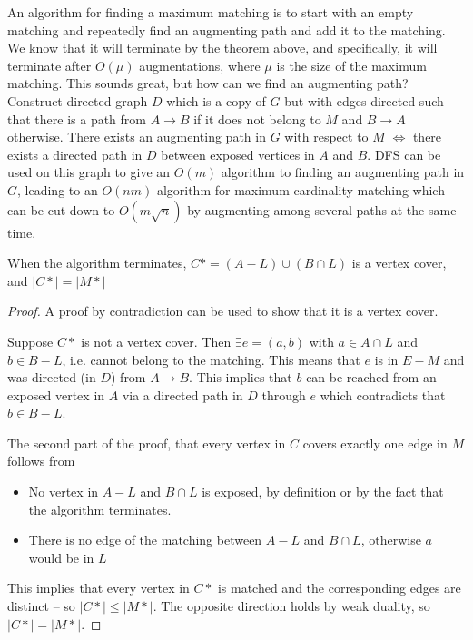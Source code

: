 \documentclass[../notes.tex]{subfiles}
\begin{document}
An algorithm for finding a maximum matching is to start with an empty matching and repeatedly find an augmenting path and add it to the matching. 
We know that it will terminate by the theorem above, and specifically, it will terminate after $ O(\mu) $ augmentations, where $ \mu $ is the size of the maximum matching. 
This sounds great, but how can we find an augmenting path? Construct directed graph $ D $ which is a copy of $ G $ but with edges directed such that there is a path from $ A \to B $ if it does not belong to $ M $ and $ B \to A $ otherwise.
There exists an augmenting path in $ G $ with respect to $ M $ $ \iff $ there exists a directed path in $ D $ between exposed vertices in $ A $ and $ B $. DFS can be used on this graph to give an $ O(m) $ algorithm to finding an augmenting path in $ G $, leading to an $ O(nm) $ algorithm for maximum cardinality matching which can be cut down to $ O(m \sqrt{n})$ by augmenting among several paths at the same time.

When the algorithm terminates, $ C* = (A-L) \cup (B \cap L) $ is a vertex cover, and $ |C*| = |M*|$

\begin{proof}
    A proof by contradiction can be used to show that it is a vertex cover.

    Suppose $ C* $ is not a vertex cover. Then $ \exists e = (a,b)  $ with $ a \in A\cap L $ and $ b \in B - L $, i.e. cannot belong to the matching. This means that $ e $ is in $ E - M $ and was directed (in $ D $) from $  A \to B $.
    This implies that $ b $ can be reached from an exposed vertex in $ A $  via a directed path in $ D $ through $ e $ which contradicts that $ b \in B-L $.


    The second part of the proof, that every vertex in $ C $ covers exactly one edge in $ M $ follows from

    \begin{itemize}
        \item No vertex in $ A-L $ and $ B \cap L $ is exposed, by definition or by the fact that the algorithm terminates.
        \item There is no edge of the matching between $ A-L $ and $ B \cap L $, otherwise $ a $ would be in $ L $
    \end{itemize}

    This implies that every vertex in $ C* $ is matched and the corresponding edges are distinct -- so $ |C*| \le  |M*| $. The opposite direction holds by weak duality, so $ |C*| = |M*| $.

\end{proof}
\end{document}
